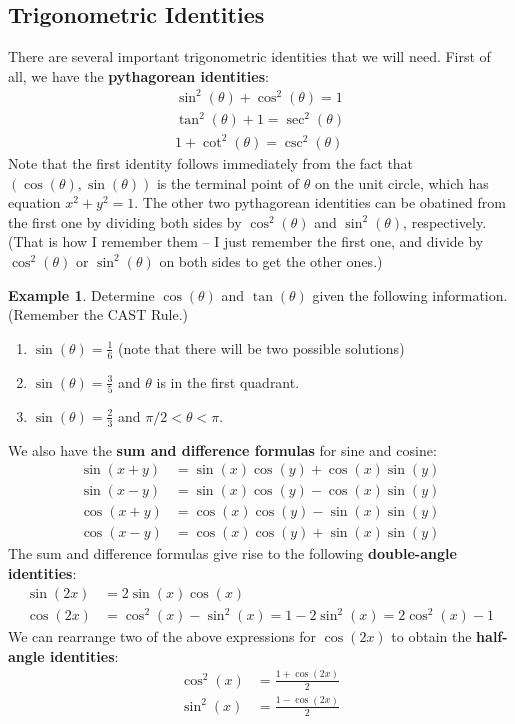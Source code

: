 \documentclass[letterpaper,12pt,oneside]{book}
\theoremstyle{definition}
\newtheorem{example}[theorem]{Example}
\begin{document}
{\newpage

\subsection*{Trigonometric Identities}

There are several important trigonometric identities that we will need.  First of all, we have the \textbf{pythagorean identities}:
\begin{align*}
\sin^2(\theta)+\cos^2(\theta)=1\\
\tan^2(\theta)+1=\sec^2(\theta)\\
1+\cot^2(\theta)=\csc^2(\theta)
\end{align*}
Note that the first identity follows immediately from the fact that $(\cos(\theta),\sin(\theta))$ is the terminal point of $\theta$ on the unit circle, which has equation $x^2+y^2=1$.  The other two pythagorean identities can be obatined from the first one by dividing both sides by $\cos^2(\theta)$ and $\sin^2(\theta)$, respectively.  (That is how I remember them -- I just remember the first one, and divide by $\cos^2(\theta)$ or $\sin^2(\theta)$ on both sides to get the other ones.)

\begin{example}
Determine $\cos(\theta)$ and $\tan(\theta)$ given the following information.  (Remember the CAST Rule.)
\begin{enumerate}
\item $\sin(\theta)=\tfrac{1}{6}$ (note that there will be two possible solutions)
\vfill
\item $\sin(\theta)=\tfrac{3}{5}$ and $\theta$ is in the first quadrant.
\vfill
\item $\sin(\theta)=\tfrac{2}{3}$ and $\pi/2<\theta<\pi$.
\vfill
\end{enumerate}
\end{example}

\newpage

We also have the \textbf{sum and difference formulas} for sine and cosine:
\begin{align*}
\sin(x+y)&=\sin(x)\cos(y)+\cos(x)\sin(y)\\
\sin(x-y)&=\sin(x)\cos(y)-\cos(x)\sin(y)\\
\cos(x+y)&=\cos(x)\cos(y)-\sin(x)\sin(y)\\
\cos(x-y)&=\cos(x)\cos(y)+\sin(x)\sin(y)
\end{align*}
The sum and difference formulas give rise to the following \textbf{double-angle identities}:
\begin{align*}
\sin(2x)&=2\sin(x)\cos(x)\\
\cos(2x)&=\cos^2(x)-\sin^2(x)=1-2\sin^2(x)=2\cos^2(x)-1
\end{align*}
We can rearrange two of the above expressions for $\cos(2x)$ to obtain the \textbf{half-angle identities}:
\begin{align*}
\cos^2(x)&=\frac{1+\cos(2x)}{2}\\
\sin^2(x)&=\frac{1-\cos(2x)}{2}
\end{align*}

}
\end{document}
